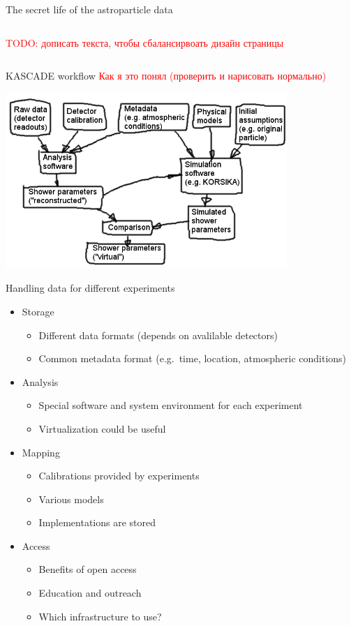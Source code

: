 \documentclass[18pt]{beamer}
\begin{document}
\begin{frame}{The secret life of the astroparticle data}
\begin{columns}
\begin{column}[t]{0.49\textwidth}
    \textcolor{red}{TODO: дописать текста, чтобы сбалансирвоать дизайн страницы}
  \end{column}

\end{columns}
\end{frame}

\begin{frame}{KASCADE workflow}
\textcolor{red}{Как я это понял (проверить и нарисовать нормально)}
\begin{center}
\includegraphics[width=0.8\textwidth]{img00.png}
\end{center}
\end{frame}

\begin{frame}{Handling data for different experiments}
\begin{itemize}
  \item Storage
  \begin{itemize}
    \item Different data formats (depends on avalilable detectors)
    \item Common metadata format (e.g.\ time, location, atmospheric conditions)
  \end{itemize}
  \item Analysis
  \begin{itemize}
    \item Special software and system environment for each experiment
    \item Virtualization could be useful
  \end{itemize}
  \item Mapping
  \begin{itemize}
    \item Calibrations provided by experiments
    \item Various models
    \item Implementations are stored
  \end{itemize}
  \item Access
  \begin{itemize}
    \item Benefits of open access
    \item Education and outreach
    \item Which infrastructure to use?
  \end{itemize}
\end{itemize}
\end{frame}
\end{document}
